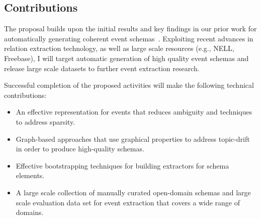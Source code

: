 \subsection{Contributions}
The proposal builds upon the initial results and key findings in our prior work for automatically generating coherent event schemas~\cite{balasubramanian-akbc12,balasubramanian2013generating}. Exploiting recent advances in relation extraction technology, as well as large scale resources (e.g., NELL, Freebase), I will target automatic generation of high quality event schemas and release large scale datasets to further event extraction research. 

Successful completion of the proposed activities will make the following technical contributions:
\begin{itemize}[noitemsep,nolistsep]
\item An effective representation for events that reduces ambiguity and techniques to address sparsity.
\item Graph-based approaches that use graphical properties to address topic-drift in order to produce high-quality schemas.
\item Effective bootstrapping techniques for building extractors for schema elements.
\item  A large scale collection of manually curated open-domain schemas and large scale evaluation data set for event extraction that covers a wide range of domains.
\end{itemize}
\newpage


